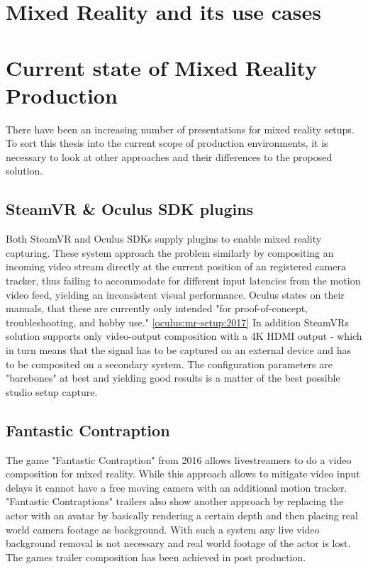 \section{Mixed Reality and its use cases}


\section{Current state of Mixed Reality Production}

There have been an increasing number of presentations for mixed reality setups. 
To sort this thesis into the current scope of production environments, it is 
necessary to look at other approaches and their differences to the proposed 
solution.

\subsection{SteamVR \& Oculus SDK plugins}

Both SteamVR and Oculus SDKs supply plugins to enable mixed reality capturing. 
These system approach the problem similarly by compositing an incoming video 
stream directly at the current position of an registered camera tracker, thus 
failing to accommodate for different input latencies from the motion video 
feed, yielding an inconsistent visual performance. Oculus states on their 
manuals, that these are currently only intended "for proof-of-concept, 
troubleshooting, and hobby use." \ref{oculus:mr-setup:2017}
\newline
In addition SteamVRs solution supports only video-output composition with a 4K 
HDMI output - which in turn means that the signal has to be captured on an 
external device and has to be composited on a secondary system. The 
configuration parameters are "barebones" at best and yielding good results is a 
matter of the best possible studio setup capture.

\subsection{Fantastic Contraption}

The game "Fantastic Contraption" from 2016 allows livestreamers to do a video 
composition for mixed reality. While this approach allows to mitigate video 
input delays it cannot have a free moving camera with an additional motion 
tracker.
\newline
"Fantastic Contraptions" trailers also show another approach by replacing the 
actor with an avatar by basically rendering a certain depth and then placing 
real world camera footage as background. With such a system any live video 
background removal is not necessary and real world footage of the actor is 
lost. The games trailer composition has been achieved in post production. 
\cite{gartner:cinematography:2017}

